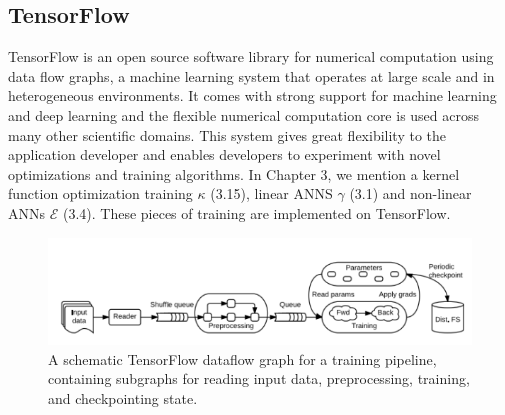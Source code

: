 \documentclass[12pt]{report} %
\begin{document}
\subsection{TensorFlow}
TensorFlow\cite{TF, TF2} is an open source software library for numerical computation using data flow graphs, a machine learning system that operates at large scale and in heterogeneous environments. It comes with strong support for machine learning and deep learning and the flexible numerical computation core is used across many other scientific domains. This system gives great flexibility to the application developer and enables developers to experiment with novel optimizations and training algorithms. In Chapter 3, we mention a kernel function optimization training $\kappa$ (3.15), linear ANNS $\gamma$ (3.1) and non-linear ANNs $\mathcal{E}$ (3.4). These pieces of training are implemented on TensorFlow. 

\begin{figure}[H]
	\centering
	\includegraphics[scale=1.0]{pictures/tensorflow.png}
	\caption{A schematic TensorFlow dataflow graph for a training pipeline, containing subgraphs for reading input data, preprocessing, training, and checkpointing state\cite{TFPIC}.}
	\label{fig:3}
\end{figure}
\end{document}
